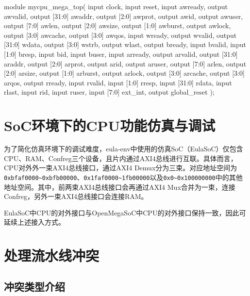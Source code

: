 \begin{CodeBlock}[language=BookVerilog]
module mycpu_mega_top(
  input         clock,
  input         reset,
  input         awready,
  output        awvalid,
  output [31:0] awaddr,
  output [2:0]  awprot,
  output        awid,
  output        awuser,
  output [7:0]  awlen,
  output [2:0]  awsize,
  output [1:0]  awburst,
  output        awlock,
  output [3:0]  awcache,
  output [3:0]  awqos,
  input         wready,
  output        wvalid,
  output [31:0] wdata,
  output [3:0]  wstrb,
  output        wlast,
  output        bready,
  input         bvalid,
  input  [1:0]  bresp,
  input         bid,
  input         buser,
  input         arready,
  output        arvalid,
  output [31:0] araddr,
  output [2:0]  arprot,
  output        arid,
  output        aruser,
  output [7:0]  arlen,
  output [2:0]  arsize,
  output [1:0]  arburst,
  output        arlock,
  output [3:0]  arcache,
  output [3:0]  arqos,
  output        rready,
  input         rvalid,
  input  [1:0]  rresp,
  input  [31:0] rdata,
  input         rlast,
  input         rid,
  input         ruser,
  input  [7:0]  ext_int,
  output        global_reset
);
\end{CodeBlock}

\section{SoC环境下的CPU功能仿真与调试}\label{sec:05-simple-cpu-013}

为了简化仿真环境下的调试难度，eula-env中使用的仿真SoC（EulaSoC）仅包含CPU、RAM、Confreg三个设备，且片内通过AXI4总线进行互联。具体而言，CPU对外外一束AXI4总线接口，通过AXI4 Demux分为三束。对应地址空间为\texttt{0xbfaf0000\textasciitilde{}0xbfb00000}、\texttt{0x1faf0000\textasciitilde{}1fb00000}以及\texttt{0x0\textasciitilde{}0x100000000}中的其他地址空间。其中，前两束AXI4总线接口会再通过AXI4 Mux合并为一束，连接Confreg，另外一束AXI4总线接口会连接RAM。

EulaSoC中CPU的对外接口与OpenMegaSoC中CPU的对外接口保持一致，因此可延续上述接入方式。

\section{处理流水线冲突}\label{sec:05-simple-cpu-014}

\subsection{冲突类型介绍}\label{sec:05-simple-cpu-015}

